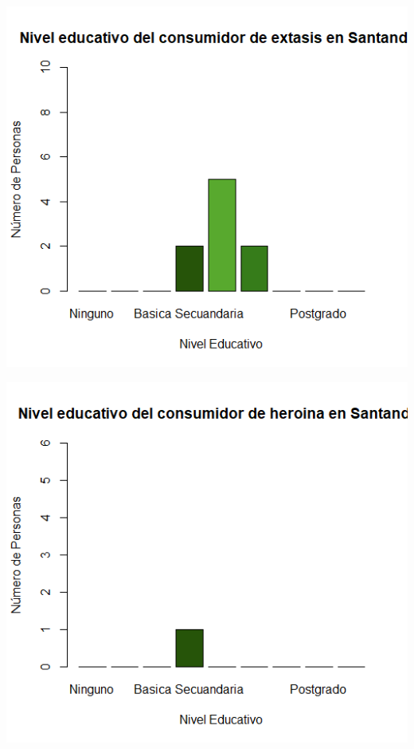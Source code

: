 \documentclass[
]{article}
\begin{document}
\includegraphics{images/extasis educacion santander.png}

\includegraphics{images/heroina educacion santander.png}
\end{document}

